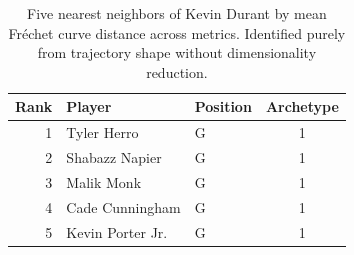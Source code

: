 \begin{table}[htbp]
  \centering\small
  \begin{tabular}{rllc}
    \toprule
    Rank & Player & Position & Archetype \\
    \midrule
    1 & Tyler Herro & G & 1 \\
    2 & Shabazz Napier & G & 1 \\
    3 & Malik Monk & G & 1 \\
    4 & Cade Cunningham & G & 1 \\
    5 & Kevin Porter Jr. & G & 1 \\
    \bottomrule
  \end{tabular}
  \caption{Five nearest neighbors of Kevin Durant by mean Fr\'{e}chet curve distance across metrics. Identified purely from trajectory shape without dimensionality reduction.}
  \label{tab:Kevin_Durant_frechet_curve_neighbors}
\end{table}

